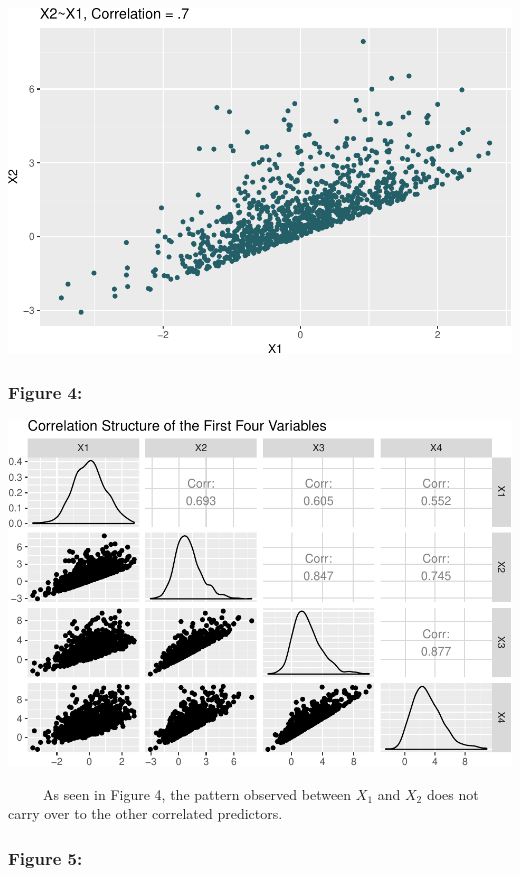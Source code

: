 \documentclass[12pt,twoside]{reedthesis}
\begin{document}
  \begin{center}\includegraphics{Thesis_files/figure-latex/unnamed-chunk-4-1} \end{center}
  
  \subsubsection{Figure 4:}\label{figure-4}
  
  \begin{center}\includegraphics{Thesis_files/figure-latex/unnamed-chunk-5-1} \end{center}
  
  ~~~~~As seen in Figure 4, the pattern observed between \(X_1\) and
  \(X_2\) does not carry over to the other correlated predictors.
  
  \subsubsection{Figure 5:}\label{figure-5}
  
\end{document}
